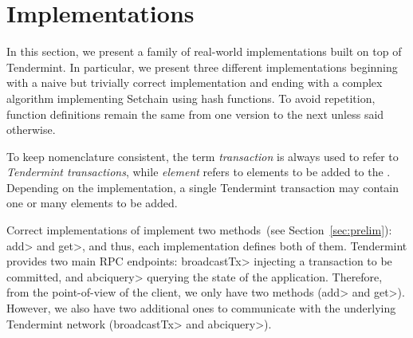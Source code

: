\section{Implementations}\label{sec:impl}

In this section, we present a family of real-world \setchain implementations
built on top of Tendermint.
%
In particular, we present three different implementations beginning with a naive
but trivially correct implementation and ending with a complex algorithm
implementing Setchain using hash functions.
%
To avoid repetition, function definitions remain the same from one version
to the next unless said otherwise.

To keep nomenclature consistent, the term \emph{transaction} is always used to
refer to \emph{Tendermint transactions}, while \emph{element} refers to elements
to be added to the \setchain.
%
Depending on the implementation, a single Tendermint transaction may contain one
or many elements to be added.

Correct implementations of \setchain implement two methods~(see
Section~\ref{sec:prelim}): \<add> and \<get>, and thus, each implementation
defines both of them.
%
Tendermint provides two main RPC endpoints: \<broadcastTx> injecting a
transaction to be committed, and \<abciquery> querying the state of the
application.
%
Therefore, from the point-of-view of the \setchain client, we only have two
methods (\<add> and \<get>).
However, we also have two additional ones to communicate with the underlying
Tendermint network (\<broadcastTx> and \<abciquery>).

%

